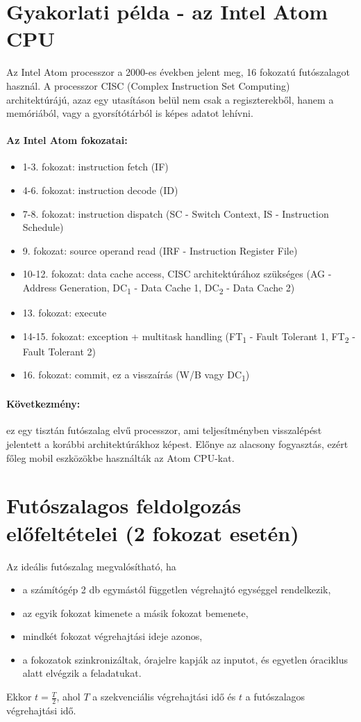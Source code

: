 \section{Gyakorlati példa - az Intel Atom CPU}
Az Intel Atom processzor a 2000-es években jelent meg, 16 fokozatú futószalagot használ.
A processzor CISC (Complex Instruction Set Computing) architektúrájú, azaz egy utasításon belül nem csak a regiszterekből, hanem a memóriából, vagy a gyorsítótárból is képes adatot lehívni.
\paragraph{Az Intel Atom fokozatai:}
\begin{itemize}
    \item 1-3. fokozat: instruction fetch (IF)
    \item 4-6. fokozat: instruction decode (ID)
    \item 7-8. fokozat: instruction dispatch (SC - Switch Context, IS - Instruction Schedule)
    \item 9. fokozat: source operand read (IRF - Instruction Register File)
    \item 10-12. fokozat: data cache access, CISC architektúrához szükséges (AG - Address Generation, DC\textsubscript{1} - Data Cache 1, DC\textsubscript{2} - Data Cache 2)
    \item 13. fokozat: execute
    \item 14-15. fokozat: exception + multitask handling (FT\textsubscript{1} - Fault Tolerant 1, FT\textsubscript{2} - Fault Tolerant 2)
    \item 16. fokozat: commit, ez a visszaírás (W/B vagy DC\textsubscript{1})
\end{itemize}
\paragraph{Következmény:} ez egy tisztán futószalag elvű processzor, ami teljesítményben visszalépést jelentett a korábbi architektúrákhoz képest.
Előnye az alacsony fogyasztás, ezért főleg mobil eszközökbe használták az Atom CPU-kat.

\section{Futószalagos feldolgozás előfeltételei (2 fokozat esetén)}
Az ideális futószalag megvalósítható, ha
\begin{itemize}
    \item a számítógép 2 db egymástól független végrehajtó egységgel rendelkezik,
    \item az egyik fokozat kimenete a másik fokozat bemenete,
    \item mindkét fokozat végrehajtási ideje azonos,
    \item a fokozatok szinkronizáltak, órajelre kapják az inputot, és egyetlen óraciklus alatt elvégzik a feladatukat.
\end{itemize}
Ekkor $t=\frac{T}{2}$, ahol $T$ a szekvenciális végrehajtási idő és $t$ a futószalagos végrehajtási idő.

